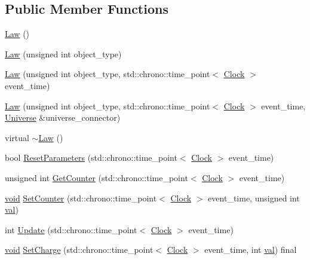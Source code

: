 \subsection*{Public Member Functions}
\begin{DoxyCompactItemize}
\item 
\mbox{\hyperlink{class_law_a3b94b6e9f09b8f457dba70f3b1c1ab43}{Law}} ()
\item 
\mbox{\hyperlink{class_law_afd1730474b2806ec6665e16419f4994c}{Law}} (unsigned int object\+\_\+type)
\item 
\mbox{\hyperlink{class_law_afdc75daa3a3346c473454c7a4dc2eab5}{Law}} (unsigned int object\+\_\+type, std\+::chrono\+::time\+\_\+point$<$ \mbox{\hyperlink{universe_8h_a0ef8d951d1ca5ab3cfaf7ab4c7a6fd80}{Clock}} $>$ event\+\_\+time)
\item 
\mbox{\hyperlink{class_law_aa4fb7baf54aa77720605fd601fb80b8d}{Law}} (unsigned int object\+\_\+type, std\+::chrono\+::time\+\_\+point$<$ \mbox{\hyperlink{universe_8h_a0ef8d951d1ca5ab3cfaf7ab4c7a6fd80}{Clock}} $>$ event\+\_\+time, \mbox{\hyperlink{class_universe}{Universe}} \&universe\+\_\+connector)
\item 
virtual \mbox{\hyperlink{class_law_a4fa6f0fb61285152c8c6d7a17b51a82b}{$\sim$\+Law}} ()
\item 
bool \mbox{\hyperlink{class_law_a56541ec0b82b8a7c377ae2e6b444205c}{Reset\+Parameters}} (std\+::chrono\+::time\+\_\+point$<$ \mbox{\hyperlink{universe_8h_a0ef8d951d1ca5ab3cfaf7ab4c7a6fd80}{Clock}} $>$ event\+\_\+time)
\item 
unsigned int \mbox{\hyperlink{class_law_ab30a86ef88a85e13d3e598caa45bff05}{Get\+Counter}} (std\+::chrono\+::time\+\_\+point$<$ \mbox{\hyperlink{universe_8h_a0ef8d951d1ca5ab3cfaf7ab4c7a6fd80}{Clock}} $>$ event\+\_\+time)
\item 
\mbox{\hyperlink{glad_8h_a950fc91edb4504f62f1c577bf4727c29}{void}} \mbox{\hyperlink{class_law_a408c401c8a44870c29ba9d08b45cb40f}{Set\+Counter}} (std\+::chrono\+::time\+\_\+point$<$ \mbox{\hyperlink{universe_8h_a0ef8d951d1ca5ab3cfaf7ab4c7a6fd80}{Clock}} $>$ event\+\_\+time, unsigned int \mbox{\hyperlink{glad_8h_a26942fd2ed566ef553eae82d2c109c8f}{val}})
\item 
int \mbox{\hyperlink{class_law_a0240b10c679b671039dbf10771342ea7}{Update}} (std\+::chrono\+::time\+\_\+point$<$ \mbox{\hyperlink{universe_8h_a0ef8d951d1ca5ab3cfaf7ab4c7a6fd80}{Clock}} $>$ event\+\_\+time)
\item 
\mbox{\hyperlink{glad_8h_a950fc91edb4504f62f1c577bf4727c29}{void}} \mbox{\hyperlink{class_law_a2e780573f6285f88d167d45a2e243d01}{Set\+Charge}} (std\+::chrono\+::time\+\_\+point$<$ \mbox{\hyperlink{universe_8h_a0ef8d951d1ca5ab3cfaf7ab4c7a6fd80}{Clock}} $>$ event\+\_\+time, int \mbox{\hyperlink{glad_8h_a26942fd2ed566ef553eae82d2c109c8f}{val}}) final

\end{DoxyCompactItemize}

